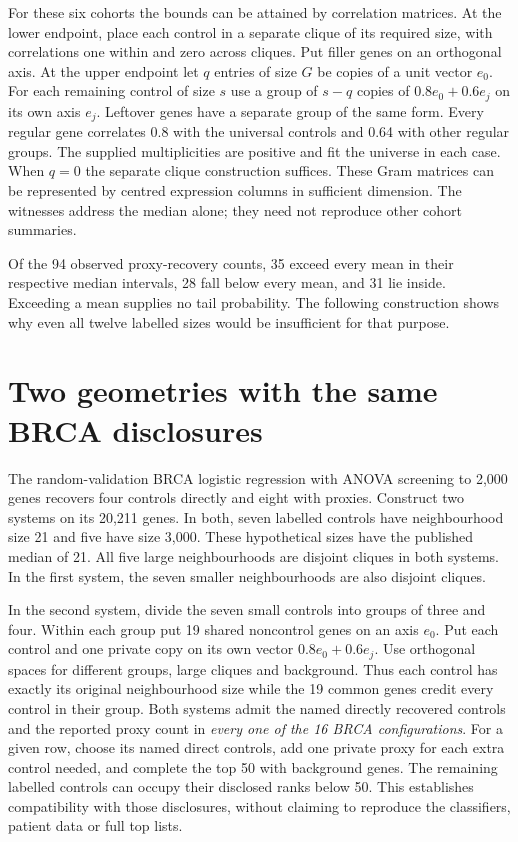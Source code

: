 \documentclass[11pt]{article}
\begin{document}
For these six cohorts the bounds can be attained by correlation matrices. At the lower endpoint, place each control in a separate clique of its required size, with correlations one within and zero across cliques. Put filler genes on an orthogonal axis. At the upper endpoint let $q$ entries of size $G$ be copies of a unit vector $e_0$. For each remaining control of size $s$ use a group of $s-q$ copies of $0.8e_0+0.6e_j$ on its own axis $e_j$. Leftover genes have a separate group of the same form. Every regular gene correlates 0.8 with the universal controls and 0.64 with other regular groups. The supplied multiplicities are positive and fit the universe in each case. When $q=0$ the separate clique construction suffices. These Gram matrices can be represented by centred expression columns in sufficient dimension. The witnesses address the median alone; they need not reproduce other cohort summaries.

Of the 94 observed proxy-recovery counts, 35 exceed every mean in their respective median intervals, 28 fall below every mean, and 31 lie inside. Exceeding a mean supplies no tail probability. The following construction shows why even all twelve labelled sizes would be insufficient for that purpose.

\newpage
\section{Two geometries with the same BRCA disclosures}
The random-validation BRCA logistic regression with ANOVA screening to 2,000 genes recovers four controls directly and eight with proxies. Construct two systems on its 20,211 genes. In both, seven labelled controls have neighbourhood size 21 and five have size 3,000. These hypothetical sizes have the published median of 21. All five large neighbourhoods are disjoint cliques in both systems. In the first system, the seven smaller neighbourhoods are also disjoint cliques.

In the second system, divide the seven small controls into groups of three and four. Within each group put 19 shared noncontrol genes on an axis $e_0$. Put each control and one private copy on its own vector $0.8e_0+0.6e_j$. Use orthogonal spaces for different groups, large cliques and background. Thus each control has exactly its original neighbourhood size while the 19 common genes credit every control in their group. Both systems admit the named directly recovered controls and the reported proxy count in \emph{every one of the 16 BRCA configurations}. For a given row, choose its named direct controls, add one private proxy for each extra control needed, and complete the top 50 with background genes. The remaining labelled controls can occupy their disclosed ranks below 50. This establishes compatibility with those disclosures, without claiming to reproduce the classifiers, patient data or full top lists.
\end{document}
